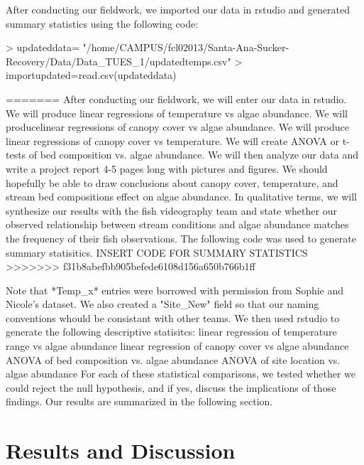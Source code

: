 \documentclass{article}
\begin{document}
After conducting our ﬁeldwork, we imported our data in rstudio and generated summary statistics using the following code: 
\begin{Schunk}
\begin{Sinput}
> updateddata= "/home/CAMPUS/fcl02013/Santa-Ana-Sucker-Recovery/Data/Data_TUES_1/updatedtemps.csv"
> importupdated=read.csv(updateddata)
\end{Sinput}
\end{Schunk}
=======
After conducting our ﬁeldwork, we will enter our data in rstudio. We will produce linear regressions of temperature vs algae abundance. We will producelinear regressions of canopy cover vs algae abundance. We will produce linear regressions of canopy cover vs temperature. We will create ANOVA or t-tests of bed composition vs. algae abundance. We will then analyze our data and write a project report 4-5 pages long with pictures and ﬁgures. We should hopefully be able to draw conclusions about canopy cover, temperature, and stream bed compositions eﬀect on algae abundance. In qualitative terms, we will synthesize our results with the ﬁsh videography team and state whether our observed relationship between stream conditions and algae abundance matches the frequency of their ﬁsh observations.
The following code was used to generate summary statisitics. 
INSERT CODE FOR SUMMARY STATISTICS
>>>>>>> f31b8abefbb905befede6108d156a650b766b1ff

Note that *Temp\_x* entries were borrowed with permission from Sophie and Nicole's dataset. We also created a "Site\_New" field so that our naming conventions whould be consistant with other teams. We then used rstudio to generate the following descriptive statisitcs:  
linear regression of temperature range vs algae abundance
linear regression of canopy cover vs algae abundance
ANOVA of bed composition vs. algae abundance
ANOVA of site location vs. algae abundance
For each of these statistical comparisons, we tested whether we could reject the null hypothesis, and if yes, discuss the implications of those findings. Our results are summarized in the following section. 
\section{Results and Discussion}
\end{document}
